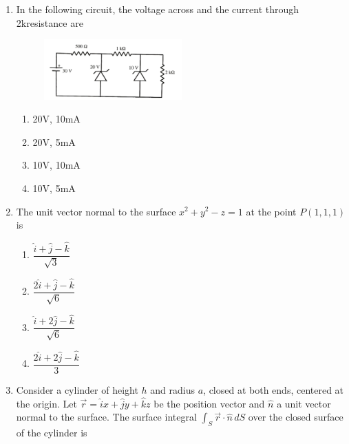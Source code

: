 \documentclass[journal,12pt,onecolumn]{IEEEtran}
\begin{document}
\begin{enumerate}
\item In the following circuit, the voltage across and the current through 2k\ohm resistance are

\begin{figure}[ht!]
    \centering
    \includegraphics[width=0.5\textwidth]{fig3.jpeg}
    \caption{}
    \label{fig:fig3.jpeg}
\end{figure}

\hfill{}

\begin{multicols}{4}
\begin{enumerate}
    \item 20V, 10mA
    \item 20V, 5mA
    \item 10V, 10mA
    \item 10V, 5mA
\end{enumerate}
\end{multicols}


\item The unit vector normal to the surface $x^{2} + y^{2} - z = 1$ at the point $P(1,1,1)$ is 

\hfill{}

\begin{multicols}{4}
\begin{enumerate}
    \item $\dfrac{\hat{i} + \hat{j} - \hat{k}}{\sqrt{3}}$
    \item $\dfrac{2\hat{i} + \hat{j} - \hat{k}}{\sqrt{6}}$
    \item $\dfrac{\hat{i} + 2\hat{j} - \hat{k}}{\sqrt{6}}$
    \item $\dfrac{2\hat{i} + 2\hat{j} - \hat{k}}{3}$
\end{enumerate}
\end{multicols}

\item Consider a cylinder of height $h$ and radius $a$, closed at both ends, centered at the origin.  
Let $\vec{r} = \hat{i}x + \hat{j}y + \hat{k}z$ be the position vector and $\hat{n}$ a unit vector normal to the surface.  
The surface integral $\int_{S} \vec{r} \cdot \hat{n} \, dS$ over the closed surface of the cylinder is


\end{enumerate}
\end{document}
